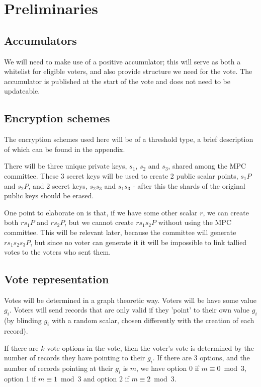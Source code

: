 \documentclass{article}
\begin{document}
\section{Preliminaries}
\subsection{Accumulators}
We will need to make use of a positive accumulator; this will serve as both a whitelist for eligible voters, and also provide structure we need for the vote. The accumulator is published at the start of the vote and does not need to be updateable.

\subsection{Encryption schemes}
The encryption schemes used here will be of a threshold type, a brief description of which can be found in the appendix.

There will be three unique private keys, $s_1$, $s_2$ and $s_3$, shared among the MPC committee. These 3 secret keys will be used to create 2 public scalar points, $s_1P$ and $s_2P$, and 2 secret keys, $s_2s_3$ and $s_1s_3$ - after this the shards of the original public keys should be erased.

One point to elaborate on is that, if we have some other scalar $r$, we can create both $rs_1P$ and $rs_2P$, but we cannot create $rs_1s_2P$ without using the MPC committee. This will be relevant later, because the committee will generate $rs_1s_2s_3P$, but since no voter can generate it it will be impossible to link tallied votes to the voters who sent them.

\subsection{Vote representation}
Votes will be determined in a graph theoretic way. Voters will be have some value $g_i$. Voters will send records that are only valid if they 'point' to their own value $g_i$ (by blinding $g_i$ with a random scalar, chosen differently with the creation of each record). 

If there are $k$ vote options in the vote, then the voter's vote is determined by the number of records they have pointing to their $g_i$. If there are 3 options, and the number of records pointing at their $g_i$ is $m$, we have option 0 if $m\equiv0\bmod3$, option 1 if $m\equiv1\bmod3$ and option 2 if $m\equiv2\bmod3$.
\end{document}
